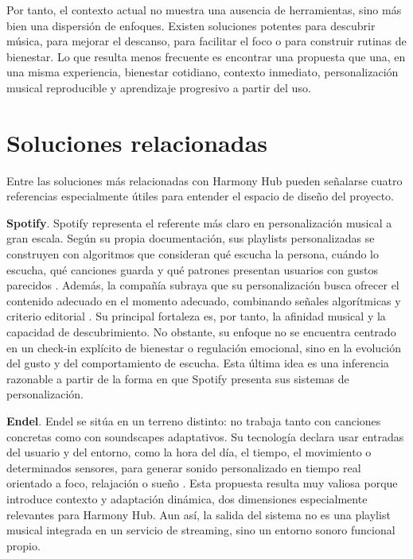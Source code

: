 Por tanto, el contexto actual no muestra una ausencia de herramientas, sino más bien una dispersión de enfoques. Existen soluciones potentes para descubrir música, para mejorar el descanso, para facilitar el foco o para construir rutinas de bienestar. Lo que resulta menos frecuente es encontrar una propuesta que una, en una misma experiencia, bienestar cotidiano, contexto inmediato, personalización musical reproducible y aprendizaje progresivo a partir del uso.

\section{Soluciones relacionadas}
\label{sec:soluciones_relacionadas}

Entre las soluciones más relacionadas con Harmony Hub pueden señalarse cuatro referencias especialmente útiles para entender el espacio de diseño del proyecto.

\textbf{Spotify}. Spotify representa el referente más claro en personalización musical a gran escala. Según su propia documentación, sus playlists personalizadas se construyen con algoritmos que consideran qué escucha la persona, cuándo lo escucha, qué canciones guarda y qué patrones presentan usuarios con gustos parecidos \cite{spotify_playlists}. Además, la compañía subraya que su personalización busca ofrecer el contenido adecuado en el momento adecuado, combinando señales algorítmicas y criterio editorial \cite{spotify_responsible_recs}. Su principal fortaleza es, por tanto, la afinidad musical y la capacidad de descubrimiento. No obstante,  su enfoque no se encuentra centrado en un check-in explícito de bienestar o regulación emocional, sino en la evolución del gusto y del comportamiento de escucha. Esta última idea es una inferencia razonable a partir de la forma en que Spotify presenta sus sistemas de personalización.

\textbf{Endel}. Endel se sitúa en un terreno distinto: no trabaja tanto con canciones concretas como con soundscapes adaptativos. Su tecnología declara usar entradas del usuario y del entorno, como la hora del día, el tiempo, el movimiento o determinados sensores, para generar sonido personalizado en tiempo real orientado a foco, relajación o sueño \cite{endel_technology}. Esta propuesta resulta muy valiosa porque introduce contexto y adaptación dinámica, dos dimensiones especialmente relevantes para Harmony Hub. Aun así, la salida del sistema no es una playlist musical integrada en un servicio de streaming, sino un entorno sonoro funcional propio.

